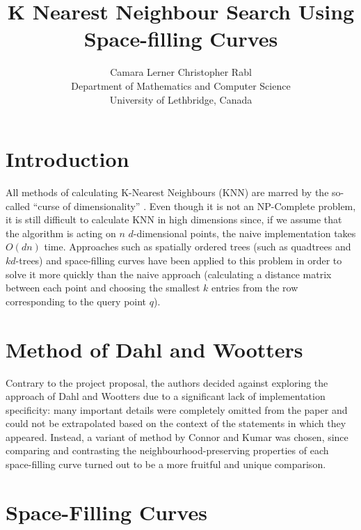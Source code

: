 \documentclass[10pt]{article}
\begin{document}
\title{K Nearest Neighbour Search Using Space-filling Curves}
\author{Camara Lerner \hspace{2cm} Christopher Rabl \\
  Department of Mathematics and Computer Science \\
  University of Lethbridge, Canada}

\maketitle

\section{Introduction}

All methods of calculating K-Nearest Neighbours (KNN) are marred by the so-called ``curse of dimensionality'' \cite{Bellman:2003}. Even though it is not an NP-Complete problem, it is still difficult to calculate KNN in high dimensions since, if we assume that the algorithm is acting on $n$ $d$-dimensional points, the naive implementation takes $O(dn)$ time. Approaches such as spatially ordered trees (such as quadtrees and $kd$-trees) and space-filling curves have been applied to this problem in order to solve it more quickly than the naive approach (calculating a distance matrix between each point and choosing the smallest $k$ entries from the row corresponding to the query point $q$).

\section{Method of Dahl and Wootters}

Contrary to the project proposal, the authors decided against exploring the approach of Dahl and Wootters \cite{Dahl:2008} due to a significant lack of implementation specificity: many important details were completely omitted from the paper and could not be extrapolated based on the context of the statements in which they appeared. Instead, a variant of method by Connor and Kumar \cite{Connor:2010} was chosen, since comparing and contrasting the neighbourhood-preserving properties of each space-filling curve turned out to be a more fruitful and unique comparison.

\section{Space-Filling Curves}
\end{document}
